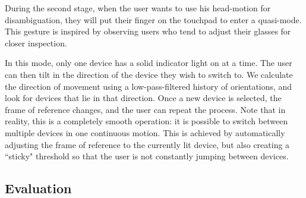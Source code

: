 During the second stage, when the user wants to use his head-motion for disambiguation, they will put their finger on the touchpad to enter a quasi-mode.  This gesture is inspired by observing users who tend to adjust their glasses for closer inspection.

In this mode, only one device has a solid indicator light on at a time.  The user can then tilt in the direction of the device they wish to switch to. We calculate the direction of movement using a low-pass-filtered history of orientations, and look for devices that lie in that direction. Once a new device is selected, the frame of reference changes, and the user can repeat the process. Note that in reality, this is a completely smooth operation: it is possible to switch between multiple devices in one continuous motion. This is achieved by automatically adjusting the frame of reference to the currently lit device, but also creating a ``sticky" threshold so that the user is not constantly jumping between devices. 




\subsection{Evaluation}



